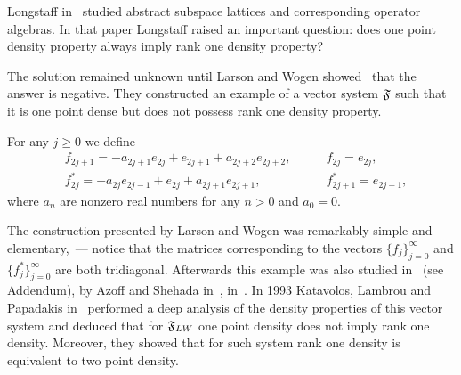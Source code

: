 \documentclass[12pt]{amsart}
\theoremstyle{case}
\begin{document}

    Long\-staff in~\cite{longstaff} studied abstract subspace lattices and corresponding operator algebras.
    In that paper Longstaff raised an important question: does one point density property always imply rank one density property?

    The solution remained unknown until Larson and Wogen showed~\cite{larson} that the answer is negative.
    They constructed an example of a vector system $\mathfrak{F}$ such that it is one point dense but does not possess rank one density property.
    \begin{example}
      \label{lw-sys}
      For any $j \geq 0$ we define
      \begin{align*}
        &f_{2j+1}=-a_{2j+1}e_{2j} + e_{2j+1} + a_{2j+2}e_{2j+2}, \qquad &f_{2j}=e_{2j},\\
        &f^*_{2j}=-a_{2j}e_{2j-1} + e_{2j} + a_{2j+1}e_{2j+1}, \qquad &f^*_{2j+1}=e_{2j+1},
      \end{align*}
      where $a_n$ are nonzero real numbers for any $n > 0$ and $a_0 = 0$.
    \end{example}
    The construction presented by Larson and Wogen was remarkably simple and elementary,~--- notice that the matrices corresponding to
      the vectors $\{f_j\}_{j=0}^\infty$ and $\{f^*_j\}_{j=0}^\infty$ are both tridiagonal.
    Afterwards this example was also studied in~\cite{argyroslambrou} (see Addendum), by Azoff and Shehada in~\cite{azoff}, in~\cite{me1}.
    In 1993 Katavolos, Lambrou and Papadakis in~\cite{katavolos} performed a deep analysis of the density properties
      of this vector system and deduced that for $\mathfrak{F}_{LW}$ one point density does not imply rank one density.
    Moreover, they showed that for such system rank one density is equivalent to two point density.
\end{document}
